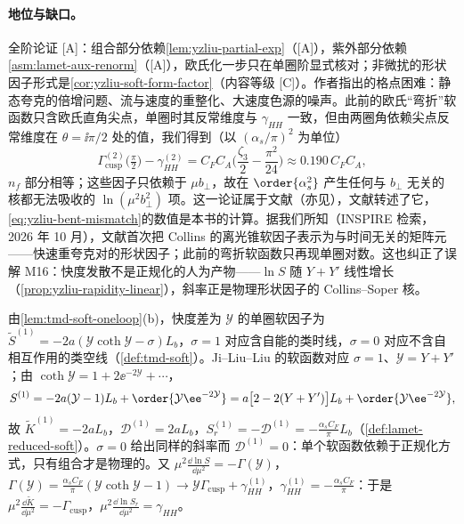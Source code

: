 \paragraph{地位与缺口。}全阶论证 [A]：组合部分依赖\cref{lem:yzliu-partial-exp}（[A]），紫外部分依赖\cref{asm:lamet-aux-renorm}（[A]），欧氏化一步只在单圈阶显式核对；非微扰的形状因子形式是\cref{cor:yzliu-soft-form-factor}（内容等级 [C]）。作者指出的格点困难：静态夸克的倍增问题、流与速度的重整化、大速度色源的噪声\cite{Ji:2019sxk}。此前的欧氏“弯折”软函数\cite{Ji:2014hxa,Ebert:2019okf}只含欧氏直角尖点，单圈时其反常维度与 $\gamma_{HH}$ 一致，但由两圈角依赖尖点反常维度\cite{KorchemskyRadyushkin1987}在 $\theta=\ii\pi/2$ 处的值，我们得到（以 $(\alpha_s/\pi)^2$ 为单位）%
\begin{equation}\label{eq:yzliu-bent-mismatch}
\Gamma^{(2)}_{\mathrm{cusp}}\big(\tfrac\pi2\big)-\gamma^{(2)}_{HH}=C_FC_A\Big(\frac{\zeta_3}{2}-\frac{\pi^2}{24}\Big)\approx0.190\,C_FC_A ,
\end{equation}
$n_f$ 部分相等；这些因子只依赖于 $\mu b_\perp$，故在 $\order{\alpha_s^2}$ 产生任何与 $b_\perp$ 无关的核都无法吸收的 $\ln(\mu^2b_\perp^2)$ 项。这一论证属于文献\cite{Ji:2019sxk}（亦见\cite{Ji:2019ewn}），文献\cite{Ebert:2022fmh}转述了它，\cref{eq:yzliu-bent-mismatch}的数值是本书的计算。据我们所知（INSPIRE 检索，2026 年 10 月），文献\cite{Ji:2019sxk}首次把 Collins 的离光锥软因子表示为与时间无关的矩阵元——快速重夸克对的形状因子；此前的弯折软函数只再现单圈对数。这也纠正了误解 M16：快度发散不是正规化的人为产物——$\ln S$ 随 $Y+Y'$ 线性增长（\cref{prop:yzliu-rapidity-linear}），斜率正是物理形状因子的 Collins--Soper 核。

\begin{example}[单圈离光锥软函数与 $S_r$]\label{ex:yzliu-soft-oneloop}
由\cref{lem:tmd-soft-oneloop}(b)，快度差为 $\mathcal Y$ 的单圈软因子为 $\tilde S^{(1)}=-2a(\mathcal Y\coth\mathcal Y-\sigma)L_b$，$\sigma=1$ 对应含自能的类时线，$\sigma=0$ 对应不含自相互作用的类空线（\cref{def:tmd-soft}）。Ji--Liu--Liu 的软函数对应 $\sigma=1$、$\mathcal Y=Y+Y'$；由 $\coth\mathcal Y=1+2\ee^{-2\mathcal Y}+\cdots$，%
\begin{equation}\label{eq:yzliu-soft-oneloop}
S^{(1)}=-2a(\mathcal Y-1)L_b+\order{\mathcal Y\ee^{-2\mathcal Y}}=a\big[2-2(Y+Y')\big]L_b+\order{\mathcal Y\ee^{-2\mathcal Y}} ,
\end{equation}
故 $\tilde K^{(1)}=-2aL_b$，$\mathcal D^{(1)}=2aL_b$，$S_r^{(1)}=-\mathcal D^{(1)}=-\frac{\alpha_sC_F}{\pi}L_b$（\cref{def:lamet-reduced-soft}）。$\sigma=0$ 给出同样的斜率而 $\mathcal D^{(1)}=0$：单个软函数依赖于正规化方式，只有组合才是物理的。又 $\mu^2\frac{\dd\ln S}{\dd\mu^2}=-\Gamma(\mathcal Y)$，$\Gamma(\mathcal Y)=\frac{\alpha_sC_F}{\pi}(\mathcal Y\coth\mathcal Y-1)\to\mathcal Y\Gamma_{\mathrm{cusp}}+\gamma^{(1)}_{HH}$，$\gamma^{(1)}_{HH}=-\frac{\alpha_sC_F}{\pi}$：于是 $\mu^2\frac{\dd\tilde K}{\dd\mu^2}=-\Gamma_{\mathrm{cusp}}$，$\mu^2\frac{\dd\ln S_r}{\dd\mu^2}=\gamma_{HH}$。
\end{example}

